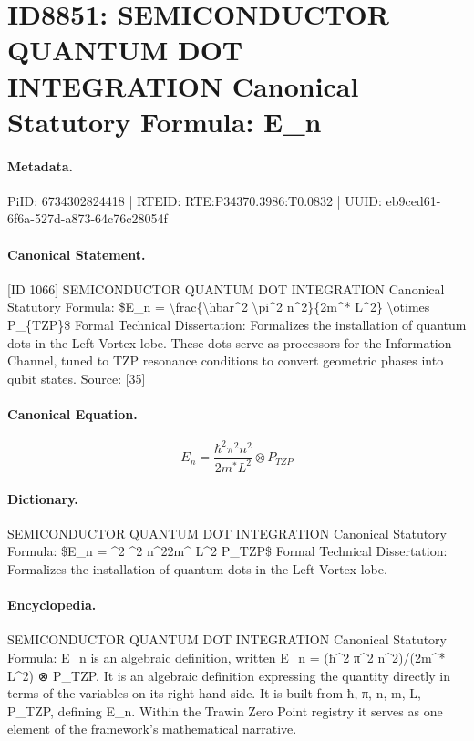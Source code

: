 \section*{ID8851: SEMICONDUCTOR QUANTUM DOT INTEGRATION Canonical Statutory Formula: E\_n}
\paragraph{Metadata.}
PiID: 6734302824418 | RTEID: RTE:P34370.3986:T0.0832 | UUID: eb9ced61-6f6a-527d-a873-64c76c28054f

\paragraph{Canonical Statement.}
[ID 1066] SEMICONDUCTOR QUANTUM DOT INTEGRATION Canonical Statutory Formula: \$E\_n = \textbackslash{}frac\{\textbackslash{}hbar\textasciicircum{}2 \textbackslash{}pi\textasciicircum{}2 n\textasciicircum{}2\}\{2m\textasciicircum{}* L\textasciicircum{}2\} \textbackslash{}otimes P\_\{TZP\}\$ Formal Technical Dissertation: Formalizes the installation of quantum dots in the Left Vortex lobe. These dots serve as processors for the Information Channel, tuned to TZP resonance conditions to convert geometric phases into qubit states. Source: [35]

\paragraph{Canonical Equation.}
\[
E_n = \frac{\hbar^2 \pi^2 n^2}{2m^* L^2} \otimes P_{TZP}
\]

\paragraph{Dictionary.}
SEMICONDUCTOR QUANTUM DOT INTEGRATION Canonical Statutory Formula: \$E\_n = \textasciicircum{}2 \textasciicircum{}2 n\textasciicircum{}22m\textasciicircum{} L\textasciicircum{}2 P\_TZP\$ Formal Technical Dissertation: Formalizes the installation of quantum dots in the Left Vortex lobe.

\paragraph{Encyclopedia.}
SEMICONDUCTOR QUANTUM DOT INTEGRATION Canonical Statutory Formula: E\_n is an algebraic definition, written E\_n = (ħ\textasciicircum{}2 π\textasciicircum{}2 n\textasciicircum{}2)/(2m\textasciicircum{}* L\textasciicircum{}2) ⊗ P\_TZP. It is an algebraic definition expressing the quantity directly in terms of the variables on its right-hand side. It is built from ħ, π, n, m, L, P\_TZP, defining E\_n. Within the Trawin Zero Point registry it serves as one element of the framework's mathematical narrative.
